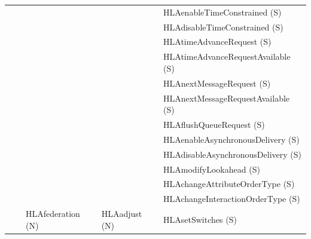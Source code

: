 \begin{compactstdpage}
\begin{momtabletypeset}[8.00]
{{\begin{tabular}{|Y{76.87pt}|Y{60.44pt}|Y{67.64pt}|Y{54.56pt}|Y{156.97pt}|}
                    & &                   &                        & HLAenableTimeConstrained (S)                                \\
                    & &                   &                        & HLAdisableTimeConstrained (S)                               \\
                    & &                   &                        & HLAtimeAdvanceRequest (S)                                   \\
                    & &                   &                        & HLAtimeAdvanceRequestAvailable (S)                          \\
                    & &                   &                        & HLAnextMessageRequest (S)                                   \\
                    & &                   &                        & HLAnextMessageRequestAvailable (S)                          \\
                    & &                   &                        & HLAflushQueueRequest (S)                                    \\
                    & &                   &                        & HLAenableAsynchronousDelivery (S)                           \\
                    & &                   &                        & HLAdisableAsynchronousDelivery (S)                          \\
                    & &                   &                        & HLAmodifyLookahead (S)                                      \\
                    & &                   &                        & HLAchangeAttributeOrderType (S)                             \\
                    & &                   &                        & HLAchangeInteractionOrderType (S)                           \\
                    & & HLAfederation (N) & HLAadjust (N)          & HLAsetSwitches (S)                                          \\

\end{tabular}}}
\end{momtabletypeset}
\end{compactstdpage}
